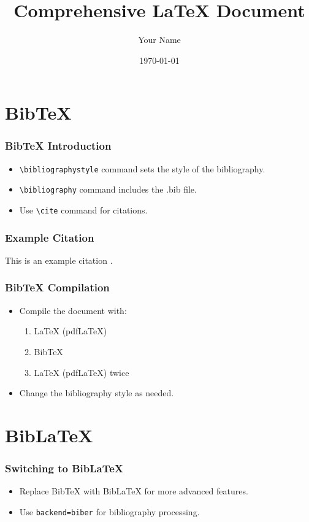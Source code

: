 \documentclass[12pt, aspectratio=169]{beamer}
\title{Comprehensive LaTeX Document}
\author{Your Name}
\date{\today}
\begin{document}
\begin{frame}
    \titlepage
\end{frame}

\section{BibTeX}

\begin{frame}
    \frametitle{BibTeX Introduction}
    \begin{itemize}
        \item \texttt{\textbackslash bibliographystyle} command sets the style of the bibliography.
        \item \texttt{\textbackslash bibliography} command includes the .bib file.
        \item Use \texttt{\textbackslash cite} command for citations.
    \end{itemize}
\end{frame}

\begin{frame}
    \frametitle{Example Citation}
    This is an example citation \cite{example1}.
    
    
\end{frame}

\begin{frame}
    \frametitle{BibTeX Compilation}
    \begin{itemize}
        \item Compile the document with:
            \begin{enumerate}
                \item LaTeX (pdfLaTeX)
                \item BibTeX
                \item LaTeX (pdfLaTeX) twice
            \end{enumerate}
        \item Change the bibliography style as needed.
    \end{itemize}
\end{frame}

\section{BibLaTeX}

\begin{frame}
    \frametitle{Switching to BibLaTeX}
    \begin{itemize}
        \item Replace BibTeX with BibLaTeX for more advanced features.
        \item Use \texttt{backend=biber} for bibliography processing.
    \end{itemize}
\end{frame}
\end{document}
